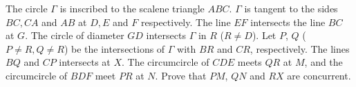 The circle $ \Gamma $ is inscribed to the scalene triangle  $ABC$. $ \Gamma $ is tangent to the sides $BC, CA$ and $AB$ at $D, E$ and $F$ respectively. The line $EF$ intersects the line $BC$ at $G$. The circle of diameter $GD$ intersects $ \Gamma $  in $R$ ($ R\neq D $). Let $P$,  $Q$ ($ P\neq R , Q\neq R $)  be the intersections of $ \Gamma $  with $BR$ and $CR$,  respectively. The lines $BQ$ and $CP$ intersects at $X$. The circumcircle of $CDE$ meets $QR$ at $M$,  and the circumcircle of $BDF$ meet $PR$ at $N$. Prove that $PM$,  $QN$ and $RX$ are concurrent.
